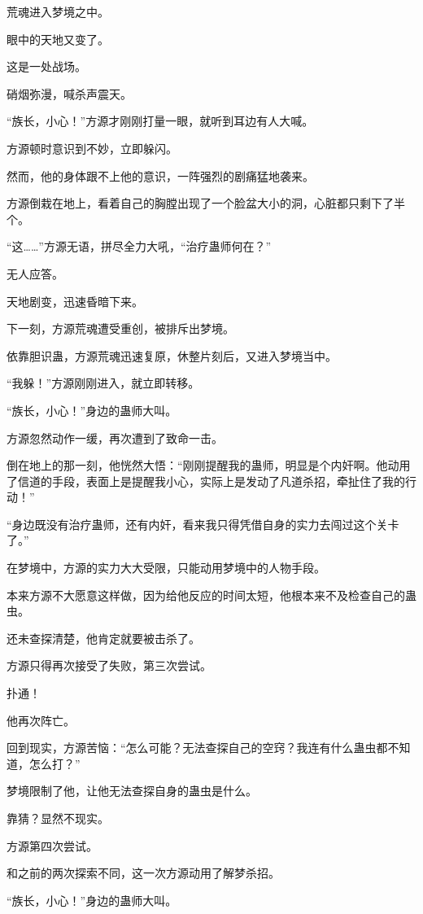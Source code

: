 \begin{this_body}
荒魂进入梦境之中。

眼中的天地又变了。

这是一处战场。

硝烟弥漫，喊杀声震天。

“族长，小心！”方源才刚刚打量一眼，就听到耳边有人大喊。

方源顿时意识到不妙，立即躲闪。

然而，他的身体跟不上他的意识，一阵强烈的剧痛猛地袭来。

方源倒栽在地上，看着自己的胸膛出现了一个脸盆大小的洞，心脏都只剩下了半个。

“这……”方源无语，拼尽全力大吼，“治疗蛊师何在？”

无人应答。

天地剧变，迅速昏暗下来。

下一刻，方源荒魂遭受重创，被排斥出梦境。

依靠胆识蛊，方源荒魂迅速复原，休整片刻后，又进入梦境当中。

“我躲！”方源刚刚进入，就立即转移。

“族长，小心！”身边的蛊师大叫。

方源忽然动作一缓，再次遭到了致命一击。

倒在地上的那一刻，他恍然大悟：“刚刚提醒我的蛊师，明显是个内奸啊。他动用了信道的手段，表面上是提醒我小心，实际上是发动了凡道杀招，牵扯住了我的行动！”

“身边既没有治疗蛊师，还有内奸，看来我只得凭借自身的实力去闯过这个关卡了。”

在梦境中，方源的实力大大受限，只能动用梦境中的人物手段。

本来方源不大愿意这样做，因为给他反应的时间太短，他根本来不及检查自己的蛊虫。

还未查探清楚，他肯定就要被击杀了。

方源只得再次接受了失败，第三次尝试。

扑通！

他再次阵亡。

回到现实，方源苦恼：“怎么可能？无法查探自己的空窍？我连有什么蛊虫都不知道，怎么打？”

梦境限制了他，让他无法查探自身的蛊虫是什么。

靠猜？显然不现实。

方源第四次尝试。

和之前的两次探索不同，这一次方源动用了解梦杀招。

“族长，小心！”身边的蛊师大叫。


\end{this_body}
